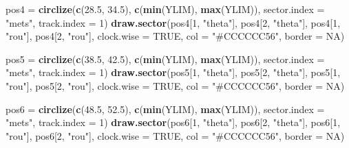 \documentclass[
]{article}
\newenvironment{Shaded}{\begin{snugshade}}{\end{snugshade}}
\newcommand{\DataTypeTok}[1]{\textcolor[rgb]{0.13,0.29,0.53}{#1}}
\newcommand{\DecValTok}[1]{\textcolor[rgb]{0.00,0.00,0.81}{#1}}
\newcommand{\FloatTok}[1]{\textcolor[rgb]{0.00,0.00,0.81}{#1}}
\newcommand{\KeywordTok}[1]{\textcolor[rgb]{0.13,0.29,0.53}{\textbf{#1}}}
\newcommand{\NormalTok}[1]{#1}
\newcommand{\OtherTok}[1]{\textcolor[rgb]{0.56,0.35,0.01}{#1}}
\newcommand{\StringTok}[1]{\textcolor[rgb]{0.31,0.60,0.02}{#1}}
\begin{document}
\begin{Shaded}
\begin{Highlighting}[]
\NormalTok{pos4 =}\StringTok{ }\KeywordTok{circlize}\NormalTok{(}\KeywordTok{c}\NormalTok{(}\FloatTok{28.5}\NormalTok{, }\FloatTok{34.5}\NormalTok{), }\KeywordTok{c}\NormalTok{(}\KeywordTok{min}\NormalTok{(YLIM), }\KeywordTok{max}\NormalTok{(YLIM)), }\DataTypeTok{sector.index =} \StringTok{"mets"}\NormalTok{, }\DataTypeTok{track.index =} \DecValTok{1}\NormalTok{)}
\KeywordTok{draw.sector}\NormalTok{(pos4[}\DecValTok{1}\NormalTok{, }\StringTok{"theta"}\NormalTok{], pos4[}\DecValTok{2}\NormalTok{, }\StringTok{"theta"}\NormalTok{], pos4[}\DecValTok{1}\NormalTok{, }\StringTok{"rou"}\NormalTok{], pos4[}\DecValTok{2}\NormalTok{, }\StringTok{"rou"}\NormalTok{], }\DataTypeTok{clock.wise =} \OtherTok{TRUE}\NormalTok{, }\DataTypeTok{col =} \StringTok{"#CCCCCC56"}\NormalTok{, }\DataTypeTok{border =} \OtherTok{NA}\NormalTok{) }

\NormalTok{pos5 =}\StringTok{ }\KeywordTok{circlize}\NormalTok{(}\KeywordTok{c}\NormalTok{(}\FloatTok{38.5}\NormalTok{, }\FloatTok{42.5}\NormalTok{), }\KeywordTok{c}\NormalTok{(}\KeywordTok{min}\NormalTok{(YLIM), }\KeywordTok{max}\NormalTok{(YLIM)), }\DataTypeTok{sector.index =} \StringTok{"mets"}\NormalTok{, }\DataTypeTok{track.index =} \DecValTok{1}\NormalTok{)}
\KeywordTok{draw.sector}\NormalTok{(pos5[}\DecValTok{1}\NormalTok{, }\StringTok{"theta"}\NormalTok{], pos5[}\DecValTok{2}\NormalTok{, }\StringTok{"theta"}\NormalTok{], pos5[}\DecValTok{1}\NormalTok{, }\StringTok{"rou"}\NormalTok{], pos5[}\DecValTok{2}\NormalTok{, }\StringTok{"rou"}\NormalTok{], }\DataTypeTok{clock.wise =} \OtherTok{TRUE}\NormalTok{, }\DataTypeTok{col =} \StringTok{"#CCCCCC56"}\NormalTok{, }\DataTypeTok{border =} \OtherTok{NA}\NormalTok{) }

\NormalTok{pos6 =}\StringTok{ }\KeywordTok{circlize}\NormalTok{(}\KeywordTok{c}\NormalTok{(}\FloatTok{48.5}\NormalTok{, }\FloatTok{52.5}\NormalTok{), }\KeywordTok{c}\NormalTok{(}\KeywordTok{min}\NormalTok{(YLIM), }\KeywordTok{max}\NormalTok{(YLIM)), }\DataTypeTok{sector.index =} \StringTok{"mets"}\NormalTok{, }\DataTypeTok{track.index =} \DecValTok{1}\NormalTok{)}
\KeywordTok{draw.sector}\NormalTok{(pos6[}\DecValTok{1}\NormalTok{, }\StringTok{"theta"}\NormalTok{], pos6[}\DecValTok{2}\NormalTok{, }\StringTok{"theta"}\NormalTok{], pos6[}\DecValTok{1}\NormalTok{, }\StringTok{"rou"}\NormalTok{], pos6[}\DecValTok{2}\NormalTok{, }\StringTok{"rou"}\NormalTok{], }\DataTypeTok{clock.wise =} \OtherTok{TRUE}\NormalTok{, }\DataTypeTok{col =} \StringTok{"#CCCCCC56"}\NormalTok{, }\DataTypeTok{border =} \OtherTok{NA}\NormalTok{) }


\end{Highlighting}
\end{Shaded}
\end{document}

